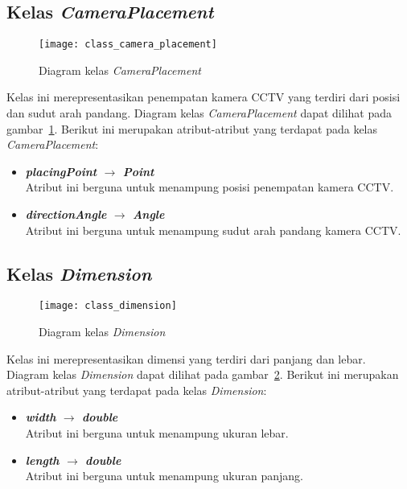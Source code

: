 \subsection{Kelas \textit{CameraPlacement}}
\begin{figure}[H]
	\centering  
	\texttt{[image: class\_camera\_placement]}
	\caption[Diagram kelas \textit{CameraPlacement}]{Diagram kelas \textit{CameraPlacement}}
	\label{fig:class_camera_placement}
\end{figure}

Kelas ini merepresentasikan penempatan kamera CCTV yang terdiri dari posisi dan sudut arah pandang. Diagram kelas \textit{CameraPlacement} dapat dilihat pada gambar~\ref{fig:class_camera_placement}. Berikut ini merupakan atribut-atribut yang terdapat pada kelas \textit{CameraPlacement}:
\begin{itemize}
	\item \textbf{\textit{placingPoint} \(\rightarrow\) \textit{Point}}\\
	Atribut ini berguna untuk menampung posisi penempatan kamera CCTV.
	\item \textbf{\textit{directionAngle} \(\rightarrow\) \textit{Angle}}\\
	Atribut ini berguna untuk menampung sudut arah pandang kamera CCTV.
\end{itemize}

\subsection{Kelas \textit{Dimension}}
\begin{figure}[H]
	\centering  
	\texttt{[image: class\_dimension]}
	\caption[Diagram kelas \textit{Dimension}]{Diagram kelas \textit{Dimension}}
	\label{fig:class_dimension}
\end{figure}

Kelas ini merepresentasikan dimensi yang terdiri dari panjang dan lebar. Diagram kelas \textit{Dimension} dapat dilihat pada gambar~\ref{fig:class_dimension}. Berikut ini merupakan atribut-atribut yang terdapat pada kelas \textit{Dimension}:
\begin{itemize}
	\item \textbf{\textit{width} \(\rightarrow\) \textit{double}}\\
	Atribut ini berguna untuk menampung ukuran lebar.
	\item \textbf{\textit{length} \(\rightarrow\) \textit{double}}\\
	Atribut ini berguna untuk menampung ukuran panjang.
\end{itemize}

